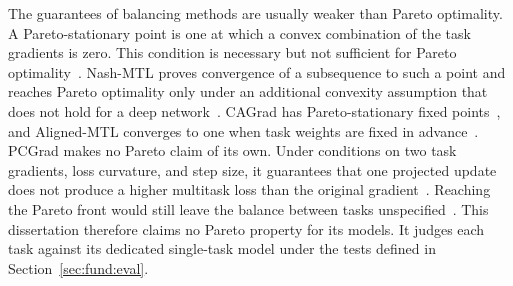 The guarantees of balancing methods are usually weaker than Pareto optimality. A
Pareto-stationary point is one at which a convex combination of the task gradients is
zero. This condition is necessary but not sufficient for Pareto
optimality~\cite{nash}. Nash-MTL proves convergence of a subsequence to such a point
and reaches Pareto optimality only under an additional convexity assumption that does
not hold for a deep network~\cite{nash}. CAGrad has Pareto-stationary fixed
points~\cite{liu2021cagrad}, and Aligned-MTL converges to one when task weights are
fixed in advance~\cite{senushkin2023aligned}. PCGrad makes no Pareto claim of its own. Under
conditions on two task gradients, loss curvature, and step size, it guarantees that
one projected update does not produce a higher multitask loss than the original
gradient~\cite{yu2020pcgrad}. Reaching the Pareto front would still leave the balance
between tasks unspecified~\cite{liu2021cagrad,senushkin2023aligned}. This
dissertation therefore claims no Pareto property for its models. It judges each task
against its dedicated single-task model under the tests defined in
Section~\ref{sec:fund:eval}.
%

